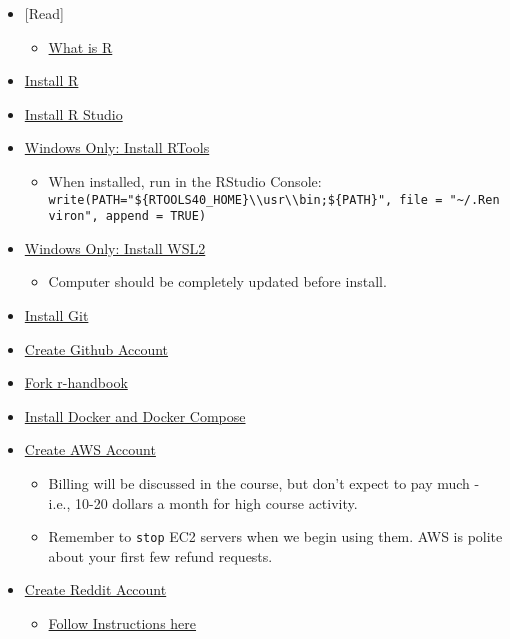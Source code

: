 \documentclass[
]{book}
\providecommand{\tightlist}{%
  \setlength{\itemsep}{0pt}\setlength{\parskip}{0pt}}
\begin{document}
\begin{itemize}
\item
  {[}Read{]}

  \begin{itemize}
  \tightlist
  \item
    \href{https://www.r-project.org/about.html}{What is R}
  \end{itemize}
\item
  \href{https://cran.r-project.org/}{Install R}
\item
  \href{https://www.rstudio.com/products/rstudio/download/}{Install R Studio}
\item
  \href{https://cran.r-project.org/bin/windows/Rtools/}{Windows Only: Install RTools}

  \begin{itemize}
  \tightlist
  \item
    When installed, run in the RStudio Console: \texttt{write(\textquotesingle{}PATH="\$\{RTOOLS40\_HOME\}\textbackslash{}\textbackslash{}usr\textbackslash{}\textbackslash{}bin;\$\{PATH\}"\textquotesingle{},\ file\ =\ "\textasciitilde{}/.Renviron",\ append\ =\ TRUE)}
  \end{itemize}
\item
  \href{https://www.omgubuntu.co.uk/how-to-install-wsl2-on-windows-10}{Windows Only: Install WSL2}

  \begin{itemize}
  \tightlist
  \item
    Computer should be completely updated before install.
  \end{itemize}
\item
  \href{https://git-scm.com/downloads}{Install Git}
\item
  \href{https://github.com/}{Create Github Account}
\item
  \href{https://github.com/fdrennan/r-handbook}{Fork r-handbook}
\item
  \href{https://docs.docker.com/get-docker/}{Install Docker and Docker Compose}
\item
  \href{https://aws.amazon.com/}{Create AWS Account}

  \begin{itemize}
  \tightlist
  \item
    Billing will be discussed in the course, but don't expect to pay much - i.e., 10-20 dollars a month for high course activity.
  \item
    Remember to \texttt{stop} EC2 servers when we begin using them. AWS is polite about your first few refund requests.
  \end{itemize}
\item
  \href{reddit.com}{Create Reddit Account}

  \begin{itemize}
  \tightlist
  \item
    \href{https://towardsdatascience.com/how-to-use-the-reddit-api-in-python-5e05ddfd1e5c}{Follow Instructions here}
  \end{itemize}
\end{itemize}
\end{document}
